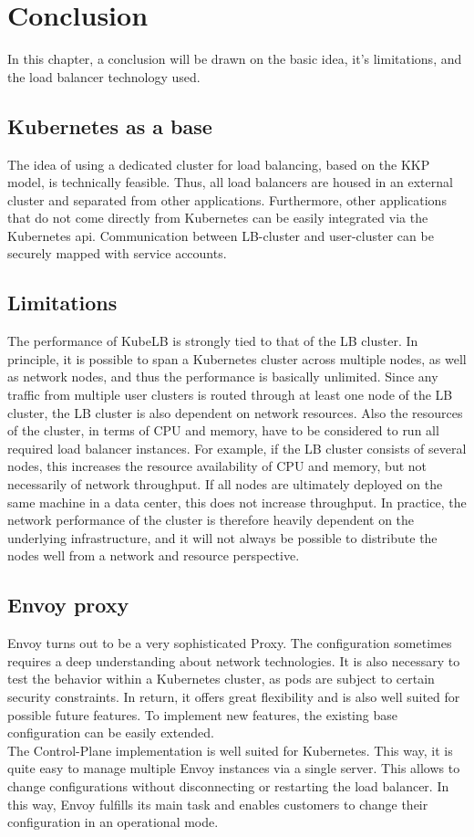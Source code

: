 \chapter{Conclusion}

In this chapter, a conclusion will be drawn on the basic idea, it's limitations, and the load balancer technology used.

\section{Kubernetes as a base}
The idea of using a dedicated cluster for load balancing, based on the KKP model, is technically feasible.
Thus, all load balancers are housed in an external cluster and separated from other applications.
Furthermore, other applications that do not come directly from Kubernetes can be easily integrated via the Kubernetes api.
Communication between LB-cluster and user-cluster can be securely mapped with service accounts.

\section{Limitations}
The performance of KubeLB is strongly tied to that of the LB cluster.
In principle, it is possible to span a Kubernetes cluster across multiple nodes, as well as network nodes, and thus the performance is basically unlimited.
Since any traffic from multiple user clusters is routed through at least one node of the LB cluster, the LB cluster is also dependent on network resources.
Also the resources of the cluster, in terms of CPU and memory, have to be considered to run all required load balancer instances.
For example, if the LB cluster consists of several nodes, this increases the resource availability of CPU and memory, but not necessarily of network throughput.
If all nodes are ultimately deployed on the same machine in a data center, this does not increase throughput.
In practice, the network performance of the cluster is therefore heavily dependent on the underlying infrastructure, and it will not always be possible to distribute the nodes well from a network and resource perspective.

\section{Envoy proxy}
Envoy turns out to be a very sophisticated Proxy.
The configuration sometimes requires a deep understanding about network technologies.
It is also necessary to test the behavior within a Kubernetes cluster, as pods are subject to certain security constraints.
In return, it offers great flexibility and is also well suited for possible future features.
To implement new features, the existing base configuration can be easily extended.
\\
The Control-Plane implementation is well suited for Kubernetes.
This way, it is quite easy to manage multiple Envoy instances via a single server.
This allows to change configurations without disconnecting or restarting the load balancer.
In this way, Envoy fulfills its main task and enables customers to change their configuration in an operational mode.
